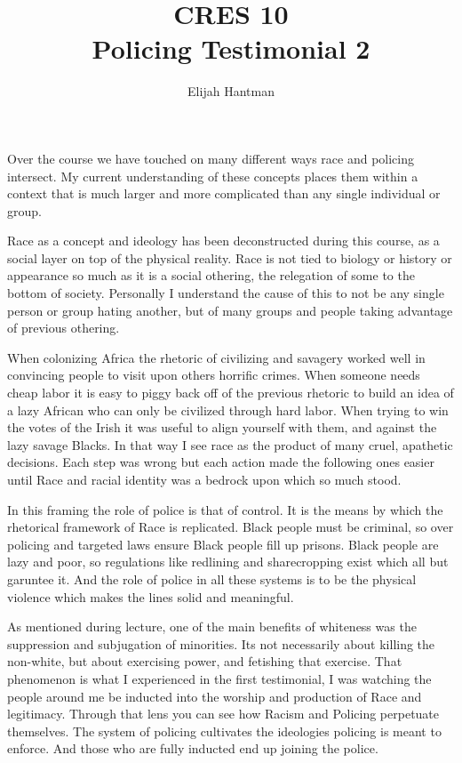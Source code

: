\documentclass{report}
\title{\Huge{CRES 10}\\Policing Testimonial 2}
\author{\huge{Elijah Hantman}}
\date{}
\begin{document}
\maketitle
\newpage

Over the course we have touched on many different ways
race and policing intersect. My current understanding of
these concepts places them within a context that is much
larger and more complicated than any single individual or
group.

Race as a concept and ideology has been deconstructed
during this course, as a social layer on top of the physical
reality. Race is not tied to biology or history or appearance
so much as it is a social othering, the relegation of some to
the bottom of society. Personally I understand the cause of 
this to not be any single person or group hating another, but
of many groups and people taking advantage of previous
othering.

When colonizing Africa the rhetoric of civilizing and savagery
worked well in convincing people to visit upon others horrific
crimes. When someone needs cheap labor it is easy to piggy back
off of the previous rhetoric to build an idea of a lazy
African who can only be civilized through hard labor. When trying
to win the votes of the Irish it was useful to align yourself
with them, and against the lazy savage Blacks. In that way I
see race as the product of many cruel, apathetic decisions.
Each step was wrong but each action made the following ones
easier until Race and racial identity was a bedrock upon which
so much stood. 

In this framing the role of police is that of control. It is the
means by which the rhetorical framework of Race is replicated.
Black people must be criminal, so over policing and targeted
laws ensure Black people fill up prisons. Black people are
lazy and poor, so regulations like redlining and sharecropping
exist which all but garuntee it. And the role of police in
all these systems is to be the physical violence which makes
the lines solid and meaningful.

As mentioned during lecture, one of the main benefits of whiteness
was the suppression and subjugation of minorities. Its not
necessarily about killing the non-white, but about exercising
power, and fetishing that exercise. That phenomenon is what
I experienced in the first testimonial, I was watching the
people around me be inducted into the worship and production
of Race and legitimacy. Through that lens you can see how 
Racism and Policing perpetuate themselves. The system of 
policing cultivates the ideologies policing is meant to 
enforce. And those who are fully inducted end up joining 
the police. 
\end{document}
